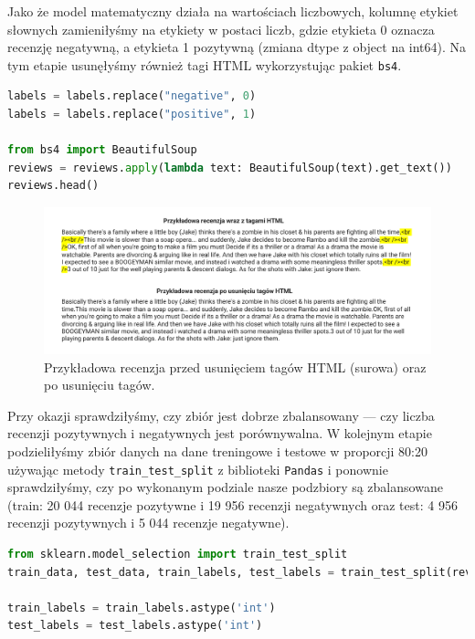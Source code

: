 \noindent Jako że model matematyczny działa na wartościach liczbowych, kolumnę etykiet słownych zamieniłyśmy na etykiety w postaci liczb, gdzie etykieta 0 oznacza recenzję negatywną, a etykieta 1 pozytywną (zmiana dtype z object na int64). Na tym etapie usunęłyśmy również tagi HTML wykorzystując pakiet \verb|bs4|.


\begin{lstlisting}[language=Python,frame=single, breaklines=true, caption=Zmiana etykiet z typu obiekt na typ liczbowy.,label=code:labelChange]
labels = labels.replace("negative", 0)
labels = labels.replace("positive", 1)

from bs4 import BeautifulSoup
reviews = reviews.apply(lambda text: BeautifulSoup(text).get_text())
reviews.head()
\end{lstlisting}

\begin{figure}[H]
	\centering
	\includegraphics[width=0.95\linewidth]{images/chapter3/cleaned-data-example.pdf}
	\caption{Przykładowa recenzja przed usunięciem tagów HTML (surowa) oraz po usunięciu tagów.}
	\label{fig:cleaned}
\end{figure}

\noindent Przy okazji sprawdziłyśmy, czy zbiór jest dobrze zbalansowany --- czy liczba recenzji pozytywnych i negatywnych jest porównywalna. W kolejnym etapie podzieliłyśmy zbiór danych na dane treningowe i testowe w proporcji 80:20 używając metody \verb|train_test_split| z biblioteki \verb|Pandas| i ponownie sprawdziłyśmy, czy po wykonanym podziale nasze podzbiory są zbalansowane (train: 20 044 recenzje pozytywne i 19 956 recenzji negatywnych oraz test: 4 956 recenzji pozytywnych i 5 044 recenzje negatywne).

\begin{lstlisting}[language=Python,frame=single, breaklines=true, caption=Podział danych na zbiór treningowy i testowy.,label=code:split]
from sklearn.model_selection import train_test_split
train_data, test_data, train_labels, test_labels = train_test_split(reviews, labels, test_size=0.2, random_state=1)

train_labels = train_labels.astype('int')
test_labels = test_labels.astype('int')
\end{lstlisting}


